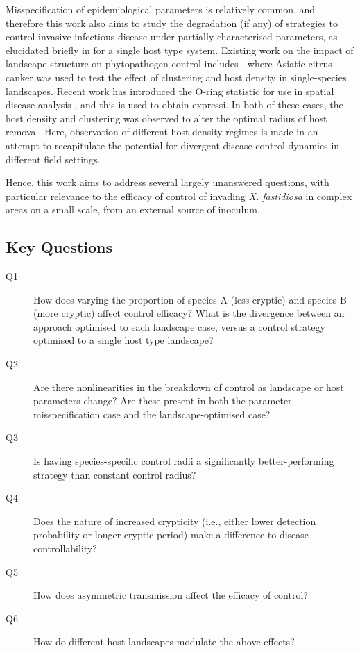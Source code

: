 \documentclass[prstpaper]{revtex4-2}
\begin{document}
Misspecification of epidemiological parameters is relatively common, and therefore this work also aims to study the degradation (if any) of strategies to control invasive infectious disease under partially characterised parameters, as elucidated briefly in \cite{HyattTwynham2017} for a single host type system. Existing work on the impact of landscape structure on phytopathogen control includes \cite{Parnell2009} \cite{Parnell2010}, where Asiatic citrus canker was used to test the effect of clustering and host density in single-species landscapes. Recent work has introduced the O-ring statistic for use in spatial disease analysis \cite{}, and this is used to obtain expressi. In both of these cases, the host density and clustering was observed to alter the optimal radius of host removal. Here, observation of different host density regimes is made in an attempt to recapitulate the potential for divergent disease control dynamics in different field settings. 

Hence, this work aims to address several largely unanswered questions, with particular relevance to the efficacy of control of invading \emph{X. fastidiosa} in complex areas on a small scale, from an external source of inoculum. 

\begin{framed}
\subsection*{Key Questions}

\begin{description}

   \item[Q1] {How does varying the proportion of species A (less cryptic) and species B (more cryptic) affect control efficacy? What is the divergence between an approach optimised to each landscape case, versus a control strategy optimised to a single host type landscape? }
    \item[Q2] {Are there nonlinearities in the breakdown of control as landscape or host parameters change? Are these present in both the parameter misspecification case and the landscape-optimised case?}
    \item[Q3] {Is having species-specific control radii a significantly better-performing strategy than constant control radius?}
    \item[Q4] {Does the nature of increased crypticity (i.e., either lower detection probability or longer cryptic period) make a difference to disease controllability? }
    \item[Q5] {How does asymmetric transmission affect the efficacy of control?}
    \item[Q6] {How do different host landscapes modulate the above effects?}
\end{description}
\end{framed}
\end{document}
